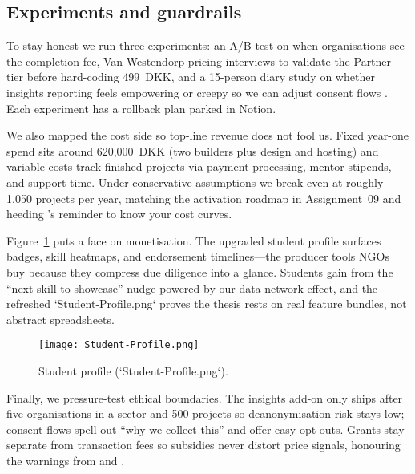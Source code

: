 \subsection*{Experiments and guardrails}
To stay honest we run three experiments: an A/B test on when organisations see the completion fee, Van Westendorp pricing interviews to validate the Partner tier before hard-coding 499~DKK, and a 15-person diary study on whether insights reporting feels empowering or creepy so we can adjust consent flows \citep{Reillier2017}. Each experiment has a rollback plan parked in Notion.

We also mapped the cost side so top-line revenue does not fool us. Fixed year-one spend sits around 620,000~DKK (two builders plus design and hosting) and variable costs track finished projects via payment processing, mentor stipends, and support time. Under conservative assumptions we break even at roughly 1,050 projects per year, matching the activation roadmap in Assignment~09 and heeding \citet{ShapiroVarian1999}'s reminder to know your cost curves.

Figure~\ref{fig:student-profile} puts a face on monetisation. The upgraded student profile surfaces badges, skill heatmaps, and endorsement timelines---the producer tools NGOs buy because they compress due diligence into a glance. Students gain from the ``next skill to showcase'' nudge powered by our data network effect, and the refreshed `Student-Profile.png` proves the thesis rests on real feature bundles, not abstract spreadsheets.

\begin{figure}[H]
  \centering
  \texttt{[image: Student-Profile.png]}
  \caption{Student profile (`Student-Profile.png`).}
  \label{fig:student-profile}
\end{figure}

Finally, we pressure-test ethical boundaries. The insights add-on only ships after five organisations in a sector and 500 projects so deanonymisation risk stays low; consent flows spell out ``why we collect this'' and offer easy opt-outs. Grants stay separate from transaction fees so subsidies never distort price signals, honouring the warnings from \citet{Zuboff2019} and \citet{Srnicek2017}.
